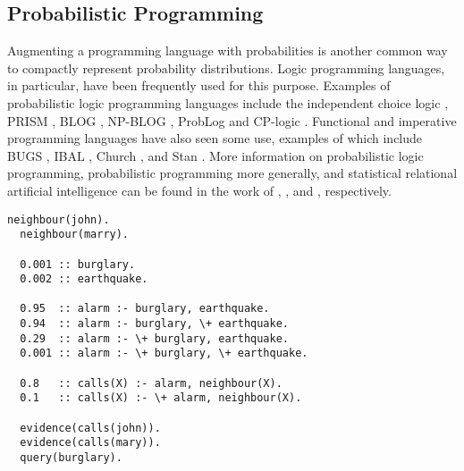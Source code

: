 \subsection{Probabilistic Programming}\label{sec:probprogramming}

Augmenting a programming language with probabilities is another common way to
compactly represent probability distributions. Logic programming languages, in
particular, have been frequently used for this purpose. Examples of
probabilistic logic programming languages include the independent choice logic
\citep{DBLP:journals/ai/Poole97,DBLP:conf/ilp/Poole08}, PRISM
\citep{DBLP:conf/ijcai/SatoK97,DBLP:conf/ilp/SatoK08}, BLOG
\citep{DBLP:conf/ijcai/MilchMRSOK05}, NP-BLOG
\citep{DBLP:conf/uai/CarbonettoKFP05}, ProbLog \citep{DBLP:conf/ijcai/RaedtKT07}
and CP-logic \citep{DBLP:journals/tplp/VennekensDB09}. Functional and imperative
programming languages have also seen some use, examples of which include BUGS
\citep{gilks1994language}, IBAL \citep{DBLP:conf/ijcai/Pfeffer01}, Church
\citep{DBLP:conf/uai/GoodmanMRBT08}, and Stan \citep{stan}. More information on
probabilistic logic programming, probabilistic programming more generally, and
statistical relational artificial intelligence can be found in the work of
\citet{DBLP:conf/ilp/2008p}, \citet{DBLP:conf/icse/GordonHNR14}, and
\citet{DBLP:series/synthesis/2016Raedt}, respectively.

\noindent\begin{minipage}{\linewidth}
\begin{lstlisting}[frame=tb,caption=A ProbLog program that computes
  $\protect{\Pr(B \mid J, M)}$ for the scenario described in \cref{example:bn}.,
  label={lst:problog}]
  neighbour(john).
  neighbour(marry).

  0.001 :: burglary.
  0.002 :: earthquake.

  0.95  :: alarm :- burglary, earthquake.
  0.94  :: alarm :- burglary, \+ earthquake.
  0.29  :: alarm :- \+ burglary, earthquake.
  0.001 :: alarm :- \+ burglary, \+ earthquake.

  0.8   :: calls(X) :- alarm, neighbour(X).
  0.1   :: calls(X) :- \+ alarm, neighbour(X).

  evidence(calls(john)).
  evidence(calls(mary)).
  query(burglary).
\end{lstlisting}
\end{minipage}

